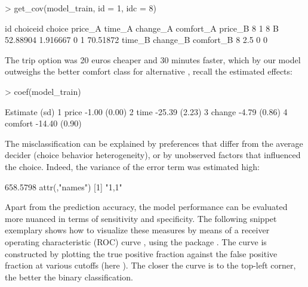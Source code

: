 \documentclass[article]{jss}
\begin{document}
\begin{Schunk}
\begin{Sinput}
> get_cov(model_train, id = 1, idc = 8)
\end{Sinput}
\begin{Soutput}
  id choiceid choice  price_A   time_A change_A comfort_A  price_B
8  1        8      B 52.88904 1.916667        0         1 70.51872
  time_B change_B comfort_B
8    2.5        0         0
\end{Soutput}
\end{Schunk}

The trip option  was 20 euros cheaper and 30 minutes faster, which by our model outweighs the better comfort class for alternative , recall the estimated effects:

\begin{Schunk}
\begin{Sinput}
> coef(model_train)
\end{Sinput}
\begin{Soutput}
           Estimate   (sd)
1   price     -1.00 (0.00)
2    time    -25.39 (2.23)
3  change     -4.79 (0.86)
4 comfort    -14.40 (0.90)
\end{Soutput}
\end{Schunk}

The misclassification can be explained by preferences that differ from the average decider (choice behavior heterogeneity), or by unobserved factors that influenced the choice. Indeed, the variance of the error term was estimated high:

\begin{Schunk}
\begin{Soutput}
         [,1]
[1,] 658.5798
attr(,"names")
[1] "1,1"
\end{Soutput}
\end{Schunk}

Apart from the prediction accuracy, the model performance can be evaluated more nuanced in terms of sensitivity and specificity. The following snippet exemplary shows how to visualize these measures by means of a receiver operating characteristic (ROC) curve \citep{Fawcett:2006}, using the  package \citep{Sachs:2017}. The curve is constructed by plotting the true positive fraction against the false positive fraction at various cutoffs (here ). The closer the curve is to the top-left corner, the better the binary classification.
\end{document}
